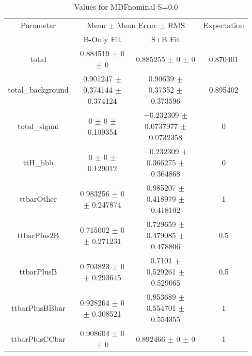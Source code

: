 \begin{table}
\centering
\caption{Values for MDFnominal S=0.0}
\begin{tabular}{cccc}
\toprule
Parameter & \multicolumn{2}{c}{Mean $\pm$ Mean Error $\pm$ RMS} & Expectation\\
 & B-Only Fit & S+B Fit & \\
\midrule
total & \num{0.884519} $\pm$ \num{0} $\pm$ \num{0} & \num{0.885255} $\pm$ \num{0} $\pm$ \num{0} & \num{0.870401}\\
total\_background & \num{0.901247} $\pm$ \num{0.374144} $\pm$ \num{0.374124} & \num{0.90639} $\pm$ \num{0.37352} $\pm$ \num{0.373596} & \num{0.895402}\\
total\_signal & \num{0} $\pm$ \num{0} $\pm$ \num{0.109354} & \num{-0.232309} $\pm$ \num{0.0737977} $\pm$ \num{0.0732358} & \num{0}\\
ttH\_hbb & \num{0} $\pm$ \num{0} $\pm$ \num{0.129012} & \num{-0.232309} $\pm$ \num{0.366275} $\pm$ \num{0.364868} & \num{0}\\
ttbarOther & \num{0.983256} $\pm$ \num{0} $\pm$ \num{0.247874} & \num{0.985207} $\pm$ \num{0.418979} $\pm$ \num{0.418102} & \num{1}\\
ttbarPlus2B & \num{0.715002} $\pm$ \num{0} $\pm$ \num{0.271231} & \num{0.729659} $\pm$ \num{0.479085} $\pm$ \num{0.478806} & \num{0.5}\\
ttbarPlusB & \num{0.703823} $\pm$ \num{0} $\pm$ \num{0.293645} & \num{0.7101} $\pm$ \num{0.529261} $\pm$ \num{0.529065} & \num{0.5}\\
ttbarPlusBBbar & \num{0.928264} $\pm$ \num{0} $\pm$ \num{0.308521} & \num{0.953689} $\pm$ \num{0.554701} $\pm$ \num{0.554355} & \num{1}\\
ttbarPlusCCbar & \num{0.908604} $\pm$ \num{0} $\pm$ \num{0} & \num{0.892466} $\pm$ \num{0} $\pm$ \num{0} & \num{1}\\
\bottomrule
\end{tabular}
\end{table}